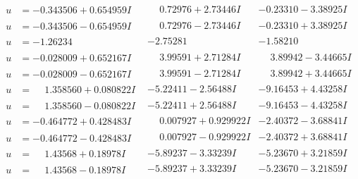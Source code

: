 \documentclass[1p]{elsarticle_modified}
\theoremstyle{definition}
\begin{document}
$$\begin{array}{c|c|c}
\begin{aligned}
u &= -0.343506 + 0.654959 I\end{aligned}
 & \phantom{-}0.72976 + 2.73446 I & -0.23310 - 3.38925 I \\ \hline\begin{aligned}
u &= -0.343506 - 0.654959 I\end{aligned}
 & \phantom{-}0.72976 - 2.73446 I & -0.23310 + 3.38925 I \\ \hline\begin{aligned}
u &= -1.26234\phantom{ +0.000000I}\end{aligned}
 & -2.75281\phantom{ +0.000000I} & -1.58210\phantom{ +0.000000I} \\ \hline\begin{aligned}
u &= -0.028009 + 0.652167 I\end{aligned}
 & \phantom{-}3.99591 + 2.71284 I & \phantom{-}3.89942 - 3.44665 I \\ \hline\begin{aligned}
u &= -0.028009 - 0.652167 I\end{aligned}
 & \phantom{-}3.99591 - 2.71284 I & \phantom{-}3.89942 + 3.44665 I \\ \hline\begin{aligned}
u &= \phantom{-}1.358560 + 0.080822 I\end{aligned}
 & -5.22411 - 2.56488 I & -9.16453 + 4.43258 I \\ \hline\begin{aligned}
u &= \phantom{-}1.358560 - 0.080822 I\end{aligned}
 & -5.22411 + 2.56488 I & -9.16453 - 4.43258 I \\ \hline\begin{aligned}
u &= -0.464772 + 0.428483 I\end{aligned}
 & \phantom{-}0.007927 + 0.929922 I & -2.40372 - 3.68841 I \\ \hline\begin{aligned}
u &= -0.464772 - 0.428483 I\end{aligned}
 & \phantom{-}0.007927 - 0.929922 I & -2.40372 + 3.68841 I \\ \hline\begin{aligned}
u &= \phantom{-}1.43568 + 0.18978 I\end{aligned}
 & -5.89237 - 3.33239 I & -5.23670 + 3.21859 I \\ \hline\begin{aligned}
u &= \phantom{-}1.43568 - 0.18978 I\end{aligned}
 & -5.89237 + 3.33239 I & -5.23670 - 3.21859 I \\ \hline\begin{aligned}

\end{aligned}
\end{array}$$
\end{document}
